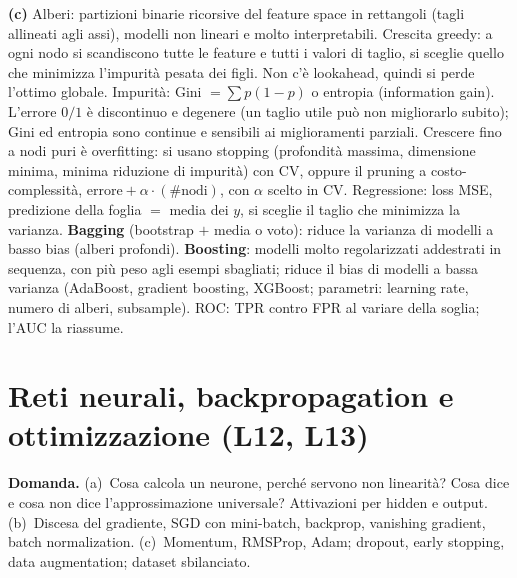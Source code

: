 \documentclass[11pt,a4paper]{article}
\newcommand{\Dom}[1]{\par\medskip\noindent\textbf{Domanda.} #1\par\nopagebreak}
\begin{document}
{\textbf{(c)} Alberi: partizioni binarie ricorsive del feature space in rettangoli (tagli allineati agli assi), modelli non lineari e molto interpretabili.
Crescita greedy: a ogni nodo si scandiscono tutte le feature e tutti i valori di taglio, si sceglie quello che minimizza l'impurit\`a pesata dei figli. Non c'\`e lookahead, quindi si perde l'ottimo globale.
Impurit\`a: Gini $=\sum p(1-p)$ o entropia (information gain). L'errore $0/1$ \`e discontinuo e degenere (un taglio utile pu\`o non migliorarlo subito); Gini ed entropia sono continue e sensibili ai miglioramenti parziali.
Crescere fino a nodi puri \`e overfitting: si usano stopping (profondit\`a massima, dimensione minima, minima riduzione di impurit\`a) con CV, oppure il pruning a costo-complessit\`a, $\text{errore}+\alpha\cdot(\#\text{nodi})$, con $\alpha$ scelto in CV.
Regressione: loss MSE, predizione della foglia $=$ media dei $y$, si sceglie il taglio che minimizza la varianza.
\textbf{Bagging} (bootstrap $+$ media o voto): riduce la varianza di modelli a basso bias (alberi profondi).
\textbf{Boosting}: modelli molto regolarizzati addestrati in sequenza, con pi\`u peso agli esempi sbagliati; riduce il bias di modelli a bassa varianza (AdaBoost, gradient boosting, XGBoost; parametri: learning rate, numero di alberi, subsample).
ROC: TPR contro FPR al variare della soglia; l'AUC la riassume.
}

\section{Reti neurali, backpropagation e ottimizzazione (L12, L13)}

\Dom{(a)~Cosa calcola un neurone, perch\'e servono non linearit\`a? Cosa dice e cosa non dice l'approssimazione universale? Attivazioni per hidden e output.
(b)~Discesa del gradiente, SGD con mini-batch, backprop, vanishing gradient, batch normalization.
(c)~Momentum, RMSProp, Adam; dropout, early stopping, data augmentation; dataset sbilanciato.}
\end{document}
